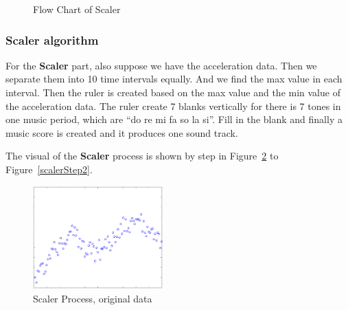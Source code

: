 \begin{figure}[H]
\caption{Flow Chart of Scaler}
\label{FlowMatcher}
\end{figure}


\subsubsection{Scaler algorithm}

   For the \textbf{Scaler} part, also suppose we have the acceleration data.
   Then we separate them into 10 time intervals equally.
   And we find the max value in each interval.
   Then the ruler is created based on the max value and the min value of the
   acceleration data.
   The ruler create 7 blanks vertically for there is 7 tones in one music
   period, which are ``do re mi fa so la si''.
   Fill in the blank and finally a music score is created and it produces one
   sound track.

   The visual of the \textbf{Scaler} process is shown by step in
   Figure~\ref{scalerStep0} to Figure~\ref{scalerStep2}.  

\begin{figure}[H]
\centering
\newcommand{\widthOfScalerStepFigure}{5cm}
\includegraphics[width=\widthOfScalerStepFigure]{figWR/scaler0}
\caption{Scaler Process, original data}
\label{scalerStep0}
\end{figure}

